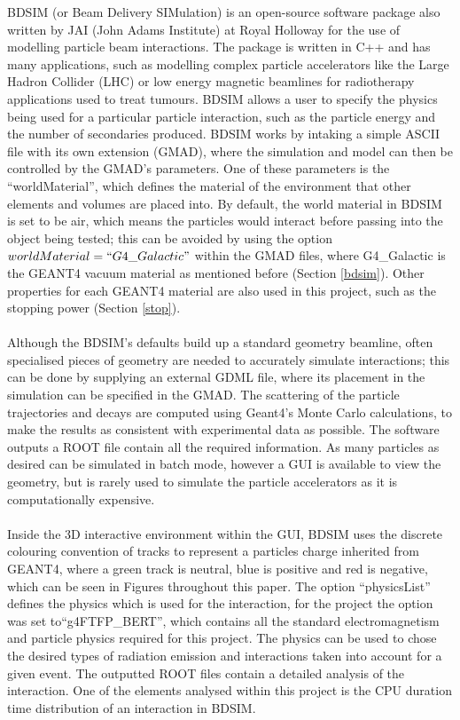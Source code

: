 \documentclass[12pt,a4paper]{article}
\begin{document}
BDSIM (or Beam Delivery SIMulation) \cite{bdsimpap} is an open-source software package also written by JAI (John Adams Institute) at Royal Holloway for the use of modelling particle beam interactions. The package is written in C++ and has many applications, such as modelling complex particle accelerators like the Large Hadron Collider (LHC) or low energy magnetic beamlines for radiotherapy applications used to treat tumours. BDSIM allows a user to specify the physics being used for a particular particle interaction, such as the particle energy and the number of secondaries produced. BDSIM works by intaking a simple ASCII file with its own extension (GMAD), where the simulation and model can then be controlled by the GMAD's parameters. One of these parameters is the ``worldMaterial'', which defines the material of the environment that other elements and volumes are placed into. By default, the world material in BDSIM is set to be air, which means the particles would interact before passing into the object being tested; this can be avoided by using the option $worldMaterial=``G4\_Galactic"$ within the GMAD files, where G4\_Galactic is the GEANT4 vacuum material as mentioned before (Section \ref{bdsim}). Other properties for each GEANT4 material are also used in this project, such as the stopping power (Section \ref{stop}).
\\\\
Although the BDSIM's defaults build up a standard geometry beamline, often specialised pieces of geometry are needed to accurately simulate interactions; this can be done by supplying an external GDML file, where its placement in the simulation can be specified in the GMAD. The scattering of the particle trajectories and decays are computed using Geant4's Monte Carlo calculations, to make the results as consistent with experimental data as possible. The software outputs a ROOT file contain all the required information. As many particles as desired can be simulated in batch mode, however a GUI is available to view the geometry, but is rarely used to simulate the particle accelerators as it is computationally expensive. 
\\\\
Inside the 3D interactive environment within the GUI, BDSIM uses the discrete colouring convention of tracks to represent a particles charge inherited from GEANT4, where a green track is neutral, blue is positive and red is negative, which can be seen in Figures throughout this paper. The option ``physicsList'' defines the physics which is used for the interaction, for the project the option was set to``g4FTFP\_BERT'', which contains all the standard electromagnetism and particle physics required for this project. The physics can be used to chose the desired types of radiation emission and interactions taken into account for a given event. The outputted ROOT files contain a detailed analysis of the interaction. One of the elements analysed within this project is the CPU duration time distribution of an interaction in BDSIM.
\end{document}
